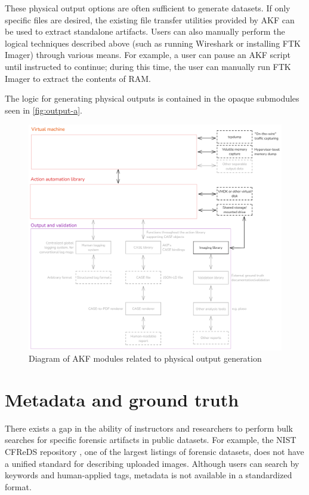 \documentclass[letterpaper,12pt]{report}
\begin{document}
These physical output options are often sufficient to generate datasets.
If only specific files are desired, the existing file transfer utilities
provided by AKF can be used to extract standalone artifacts. Users can
also manually perform the logical techniques described above (such as
running Wireshark or installing FTK Imager) through various means. For
example, a user can pause an AKF script until instructed to continue;
during this time, the user can manually run FTK Imager to extract the
contents of RAM.

The logic for generating physical outputs is contained in the opaque
submodules seen in \autoref{fig:output-a}.

\begin{figure}[htbp]
\centering
\includegraphics[width=1\linewidth]{output-and-validation-a.png}
\caption{Diagram of AKF modules related to physical output
generation}\label{fig:output-a}
\end{figure}

\section{Metadata and ground
truth}\label{metadata-and-ground-truth}

There exists a gap in the ability of instructors and researchers to
perform bulk searches for specific forensic artifacts in public
datasets. For example, the NIST CFReDS repository
\cite{nationalinstituteofstandardsandtechnologyCFReDSPortal}, one of
the largest listings of forensic datasets, does not have a unified
standard for describing uploaded images. Although users can search by
keywords and human-applied tags, metadata is not available in a
standardized format.
\end{document}

